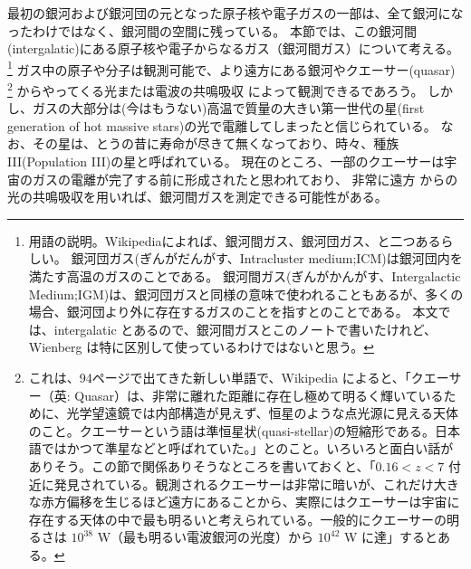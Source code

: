 \documentclass[11pt]{ltjsarticle}
\theoremstyle{plain}
\theoremstyle{break}
\begin{document}
最初の銀河および銀河団の元となった原子核や電子ガスの一部は、全て銀河になったわけではなく、銀河間の空間に残っている。
本節では、この銀河間(intergalatic)にある原子核や電子からなるガス（銀河間ガス）について考える。
\footnote{用語の説明。Wikipediaによれば、銀河間ガス、銀河団ガス、と二つあるらしい。
銀河団ガス(ぎんがだんがす、Intracluster medium;ICM)は銀河団内を満たす高温のガスのことである。
銀河間ガス(ぎんがかんがす、Intergalactic Medium;IGM)は、銀河団ガスと同様の意味で使われることもあるが、多くの場合、銀河団より外に存在するガスのことを指すとのことである。
本文では、intergalatic とあるので、銀河間ガスとこのノートで書いたけれど、Wienberg は特に区別して使っているわけではないと思う。
}
ガス中の原子や分子は観測可能で、より遠方にある銀河やクエーサー(quasar)
\footnote{これは、94ページで出てきた新しい単語で、Wikipedia によると、「クエーサー（英: Quasar）は、非常に離れた距離に存在し極めて明るく輝いているために、光学望遠鏡では内部構造が見えず、恒星のような点光源に見える天体のこと。クエーサーという語は準恒星状(quasi-stellar)の短縮形である。日本語ではかつて準星などと呼ばれていた。」とのこと。いろいろと面白い話がありそう。この節で関係ありそうなところを書いておくと、「$ 0.16 <z <7$ 付近に発見されている。観測されるクエーサーは非常に暗いが、これだけ大きな赤方偏移を生じるほど遠方にあることから、実際にはクエーサーは宇宙に存在する天体の中で最も明るいと考えられている。一般的にクエーサーの明るさは $10^{38}$ W（最も明るい電波銀河の光度）から $10^{42}$ W に達」するとある。}
からやってくる光または電波の共鳴吸収%
によって観測できるであろう。%
しかし、ガスの大部分は(今はもうない)高温で質量の大きい第一世代の星(first generation of hot massive stars)の光で電離してしまったと信じられている。%
なお、その星は、とうの昔に寿命が尽きて無くなっており、時々、種族III(Population III)の星と呼ばれている。
現在のところ、一部のクエーサーは宇宙のガスの電離が完了する前に形成されたと思われており、%
非常に遠方%
からの光の共鳴吸収を用いれば、銀河間ガスを測定できる可能性がある。
\end{document}
